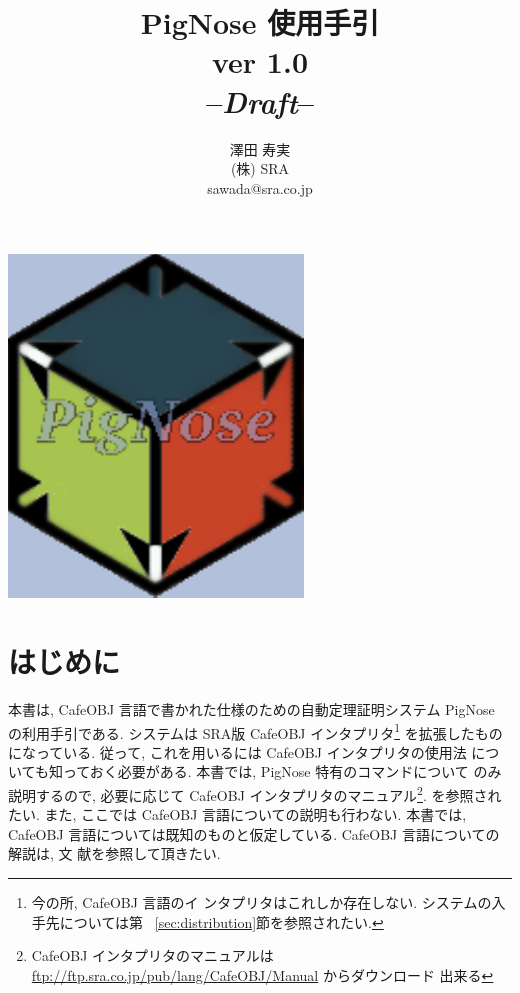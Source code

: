 \documentclass[a4paper,oneside]{memoir}
\begin{document}
\tightlists
\midsloppy
\raggedbottom
{}
\frontmatter
\pagestyle{empty}
\title{\textbf{PigNose 使用手引}\\ver 1.0 \\ --\textit{Draft}--}
\author{澤田 寿実\\
  (株) SRA\\
  sawada@sra.co.jp}
\date{}
\maketitle
  \begin{center}
    \includegraphics[scale=0.5]{pignose.pdf}
  \end{center}
\thispagestyle{empty}
\newpage
\section*{はじめに}
本書は, CafeOBJ 言語で書かれた仕様のための自動定理証明システム
PigNose の利用手引である. 
システムは SRA版 CafeOBJ インタプリタ\footnote{今の所, CafeOBJ 言語のイ
  ンタプリタはこれしか存在しない. システムの入手先については第
  ~\ref{sec:distribution}節を参照されたい.} 
を拡張したものになっている. 
従って, これを用いるには CafeOBJ インタプリタの使用法
についても知っておく必要がある. 本書では, PigNose 特有のコマンドについて
のみ説明するので, 必要に応じて CafeOBJ インタプリタのマニュアル\footnote{CafeOBJ インタプリタのマニュアルは
   \url{ftp://ftp.sra.co.jp/pub/lang/CafeOBJ/Manual} からダウンロード
   出来る}. 
を参照されたい.
また, ここでは CafeOBJ 言語についての説明も行わない. 本書では, CafeOBJ
言語については既知のものと仮定している. CafeOBJ 言語についての解説は, 文
献\cite{CafeRep}を参照して頂きたい. 
\end{document}
